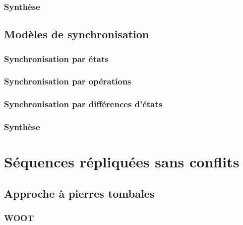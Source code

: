 \subsubsection{Synthèse}


\subsection{Modèles de synchronisation}


\subsubsection{Synchronisation par états}


\subsubsection{Synchronisation par opérations}


\subsubsection{Synchronisation par différences d'états}


\subsubsection{Synthèse}


% 

\section{Séquences répliquées sans conflits}


\subsection{Approche à pierres tombales}

\subsubsection{WOOT}


